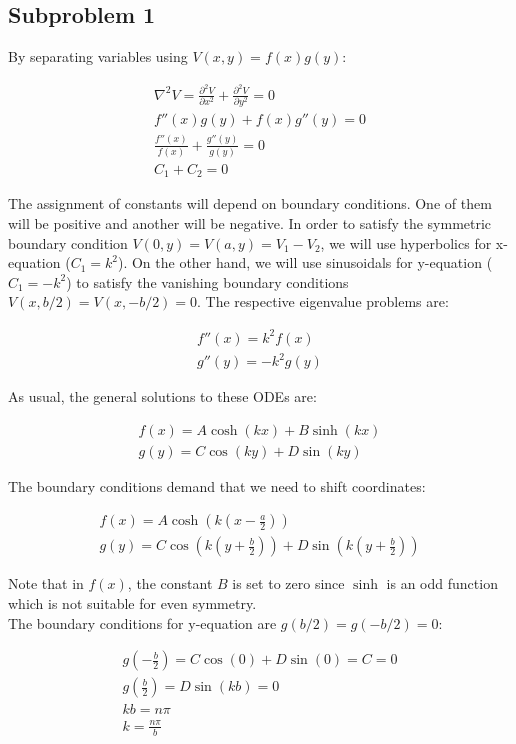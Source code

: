\documentclass[12pt, a4paper]{article}
\begin{document}
\subsection*{Subproblem 1}

By separating variables using $V(x,y)=f(x)g(y)$:

\begin{gather}
\nabla^2 V=\frac{\partial^2 V}{\partial x^2}+\frac{\partial^2 V}{\partial y^2}=0 \\
f''(x)g(y)+f(x)g''(y)=0 \\
\frac{f''(x)}{f(x)}+\frac{g''(y)}{g(y)}=0 \\
C_1+C_2=0
\end{gather}

The assignment of constants will depend on boundary conditions. One of them will be positive and another will be negative. In order to satisfy the symmetric boundary condition $V(0,y)=V(a,y)=V_1-V_2$, we will use hyperbolics for x-equation ($C_1=k^2$). On the other hand, we will use sinusoidals for y-equation ($C_1=-k^2$) to satisfy the vanishing boundary conditions $V(x,b/2)=V(x,-b/2)=0$. The respective eigenvalue problems are:

\begin{gather}
f''(x)=k^2 f(x) \\
g''(y)=-k^2g(y)
\end{gather}

As usual, the general solutions to these ODEs are:

\begin{gather}
f(x)=A\cosh(kx)+B\sinh(kx) \\
g(y)=C\cos(ky)+D\sin(ky)
\end{gather}

\noindent
The boundary conditions demand that we need to shift coordinates:

\begin{gather}
f(x)=A\cosh\left(k\left(x-\frac{a}{2}\right)\right) \\
g(y)=C\cos\left(k\left(y+\frac{b}{2}\right)\right)+D\sin\left(k\left(y+\frac{b}{2}\right)\right)
\end{gather}

Note that in $f(x)$, the constant $B$ is set to zero since $\sinh$ is an odd function which is not suitable for even symmetry. \\

The boundary conditions for y-equation are $g(b/2)=g(-b/2)=0$:

\begin{gather}
g\left(-\frac{b}{2}\right)=C\cos(0)+D\sin(0)=C=0 \\
g\left(\frac{b}{2}\right)=D\sin\left(kb\right)=0 \\
kb=n\pi \\
k=\frac{n\pi}{b}
\end{gather}
\end{document}
